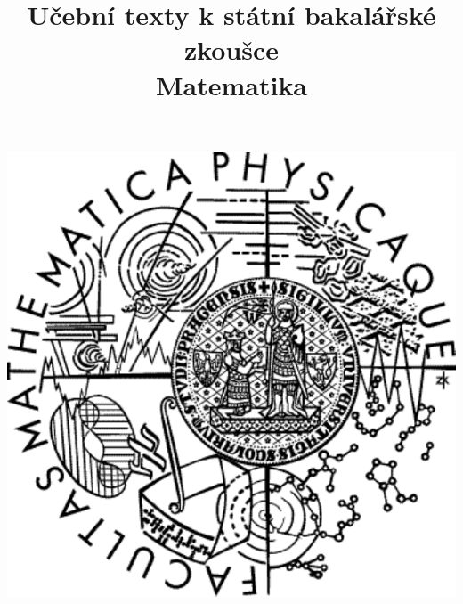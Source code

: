 \clearpage

\clearpage

\title{\LARGE Učební texty k státní bakalářské zkoušce \\ Matematika}




\maketitle

\vspace{10mm}
\begin{center}
\includegraphics[scale=0.5]{common/logo.pdf}
\end{center} 

\clearpage

\clearpage
 
\tableofcontents


\newpage

\newpage

\newpage

\newpage

\newpage

\newpage

\newpage

\newpage

\newpage

\newpage

\newpage

\newpage

\newpage

\newpage

\newpage

\newpage

\newpage



